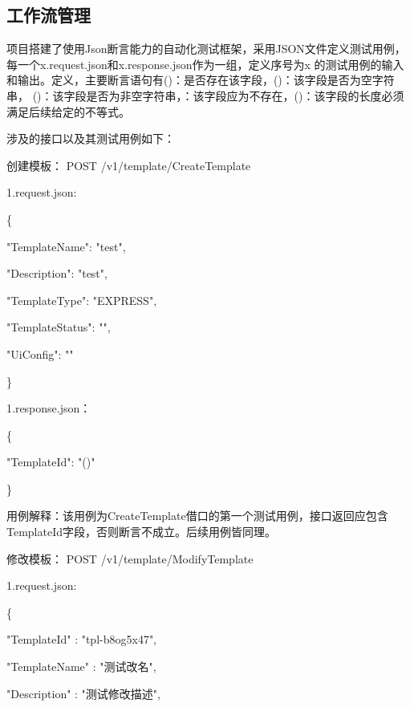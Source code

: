 \subsection{工作流管理}

项目搭建了使用Json断言能力的自动化测试框架，采用JSON文件定义测试用例，每一个x.request.json和x.response.json作为一组，定义序号为x
的测试用例的输入和输出。定义，主要断言语句有\@exists()：是否存在该字段，\@isEmpty()：该字段是否为空字符串，
\@notEmpty()：该字段是否为非空字符串，\@notExists：该字段应为不存在，\@len()：该字段的长度必须满足后续给定的不等式。

涉及的接口以及其测试用例如下：

创建模板：
POST /v1/template/CreateTemplate


1.request.json:

\{

"TemplateName": "test",

"Description": "test",

"TemplateType": "EXPRESS",


"TemplateStatus": "",

"UiConfig": ""

\}

1.response.json：

\{

"TemplateId": "\@exists()"

\}


用例解释：该用例为CreateTemplate借口的第一个测试用例，接口返回应包含TemplateId字段，否则断言不成立。后续用例皆同理。

修改模板：
POST /v1/template/ModifyTemplate

1.request.json:

\{

"TemplateId"          : "tpl-b8og5x47",

"TemplateName"        : "测试改名",

"Description"         : "测试修改描述",


